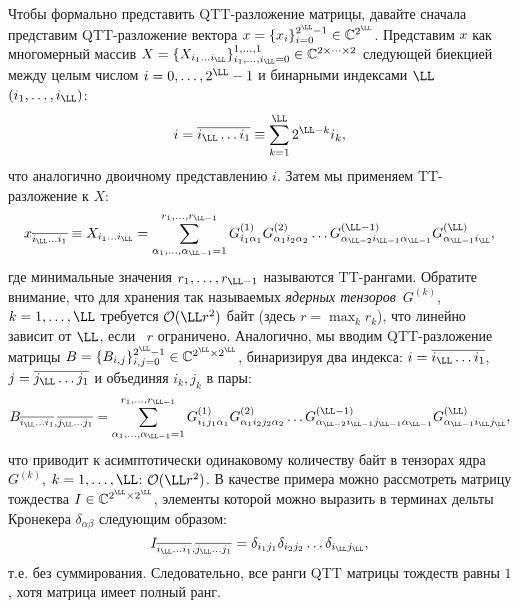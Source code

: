 Чтобы формально представить QTT-разложение матрицы, давайте сначала представим QTT-разложение вектора $x = \{x_i\}_{i=0}^{2^\LL-1}\in\mathbb{C}^{2^\LL}$. %
Представим $x$ как многомерный массив $X = \{X_{i_1\dots i_\LL}\}_{i_1,\dots, i_\LL=0}^{1,\dots,1}\in\mathbb{C}^{2\times \dots \times 2}$ следующей биекцией между целым числом $i=0,\dots,2^\LL-1$ и бинарными индексами $\LL$ $(i_1,\dots,i_\LL)$: %
\[
i =\overline{i_\LL \dots i_1} \equiv \sum_{k = 1}^\LL 2^{\LL - k} i_k,
\]
что аналогично двоичному представлению $i$.
Затем мы применяем TT-разложение к $X$:
\[
x_{\overline{i_\LL \dots i_1}} \equiv X_{i_1\dots i_\LL} = \sum_{\alpha_1,\dots,\alpha_{\LL-1}=1}^{r_1,\dots,r_{\LL-1}} G_{i_1 \alpha_1}^{(1)} G_{\alpha_1 i_2 \alpha_2}^{(2)} \dots G_{\alpha_{\LL-2} i_{\LL-1} \alpha_{\LL-1}}^{(\LL-1)} G_{\alpha_{\LL-1} i_\LL}^{(\LL)},
\]
где минимальные значения $r_1,\dots,r_{\LL-1}$ называются TT-рангами.
Обратите внимание, что для хранения так называемых \emph{ядерных тензоров}~$G^{(k)}$, $k=1,\dots,\LL$ требуется $\mathcal{O}(\LL r^2)$ байт (здесь $r=\max_k r_k$), что линейно зависит от $\LL$, если ~$r$ ограничено.
Аналогично, мы вводим QTT-разложение матрицы $B = \{B_{i,j}\}_{i,j=0}^{2^\LL-1} \in\mathbb{C}^{2^\LL\times 2^\LL}$, бинаризируя два индекса: $i =\overline{i_\LL \dots i_1}$, $j =\overline{j_\LL \dots j_1}$ и объединяя $i_k,j_k$ в пары:
\begin{equation}\label{eq:tt_mat}
B_{\overline{i_\LL \dots i_1}, \overline{j_\LL \dots j_1}} = 
\sum_{\alpha_1,\dots,\alpha_{\LL-1}=1}^{r_1,\dots,r_{\LL-1}}
G_{i_1 j_1 \alpha_1}^{(1)} G_{\alpha_1 i_2j_2 \alpha_2}^{(2)} \dots G_{\alpha_{\LL-2} i_{\LL-1}j_{\LL-1} \alpha_{\LL-1}}^{(\LL-1)} G_{\alpha_{\LL-1} i_\LL j_\LL}^{(\LL)},
\end{equation}
что приводит к асимптотически одинаковому количеству байт в тензорах ядра $G^{(k)}$, $k=1,\dots,\LL$: $\mathcal{O}(\LL r^2)$.
В качестве примера можно рассмотреть матрицу тождества $I\in\mathbb{C}^{2^\LL\times 2^\LL}$, элементы которой можно выразить в терминах дельты Кронекера $\delta_{\alpha \beta}$ следующим образом:
\[
I_{\overline{i_\LL \dots i_1}, \overline{j_\LL \dots j_1}} = \delta_{i_1 j_1} \delta_{i_2 j_2} \dots \delta_{i_\LL j_\LL},
\]
т.е. без суммирования. Следовательно, все ранги QTT матрицы тождеств равны $1$, хотя матрица имеет полный ранг.

